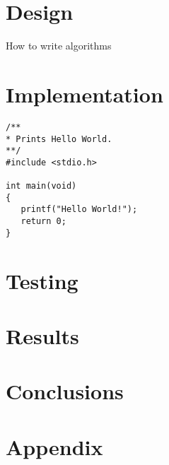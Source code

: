 \documentclass[a4paper,12pt]{article}
\begin{document}
\section{Design}

\begin{algorithm}[H]
\caption{How to write algorithms}
\label{alg:algorithm1}
\end{algorithm}

\section{Implementation}

\begin{lstlisting}
/**
* Prints Hello World. 
**/
#include <stdio.h>

int main(void) 
{
   printf("Hello World!");
   return 0;
}
\end{lstlisting}

\section{Testing}

\section{Results}

\section{Conclusions}

\pagebreak
{}
\nocite{*}


\pagebreak
{}
\section*{Appendix}
\end{document}
